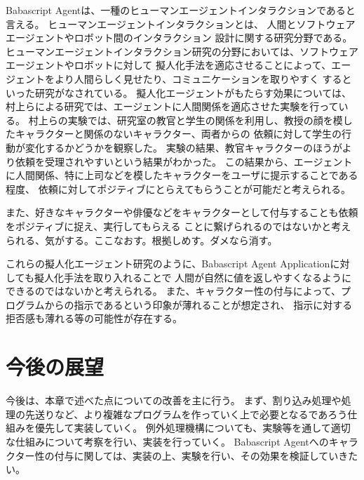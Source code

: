 Babascript
Agentは、一種のヒューマンエージェントインタラクションであると言える。
ヒューマンエージェントインタラクションとは、
人間とソフトウェアエージェントやロボット間のインタラクション
設計に関する研究分野である。
ヒューマンエージェントインタラクション研究の分野においては、ソフトウェアエージェントやロボットに対して
擬人化手法を適応させることによって、エージェントをより人間らしく見せたり、コミュニケーションを取りやすく
するといった研究がなされている。
擬人化エージェントがもたらす効果については、村上らによる研究\cite{murakami}では、エージェントに人間関係を適応させた実験を行っている。
村上らの実験では、研究室の教官と学生の関係を利用し、教授の顔を模したキャラクターと関係のないキャラクター、両者からの
依頼に対して学生の行動が変化するかどうかを観察した。
実験の結果、教官キャラクターのほうがより依頼を受理されやすいという結果がわかった。
この結果から、エージェントに人間関係、特に上司などを模したキャラクターをユーザに提示することである程度、
依頼に対してポジティブにとらえてもらうことが可能だと考えられる。

また、好きなキャラクターや俳優などをキャラクターとして付与することも依頼をポジティブに捉え、実行してもらえる
ことに繋げられるのではないかと考えられる、気がする。ここなおす。根拠しめす。ダメなら消す。

これらの擬人化エージェント研究のように、Babascript Agent
Applicationに対しても擬人化手法を取り入れることで
人間が自然に値を返しやすくなるようにできるのではないかと考えられる。
また、キャラクター性の付与によって、プログラムからの指示であるという印象が薄れることが想定され、
指示に対する拒否感も薄れる等の可能性が存在する。

\section{今後の展望}\label{ux4ecaux5f8cux306eux5c55ux671b}

今後は、本章で述べた点についての改善を主に行う。
まず、割り込み処理や処理の先送りなど、より複雑なプログラムを作っていく上で必要となるであろう仕組みを優先して実装していく。
例外処理機構についても、実験等を通して適切な仕組みについて考察を行い、実装を行っていく。
Babascript
Agentへのキャラクター性の付与に関しては、実装の上、実験を行い、その効果を検証していきたい。
